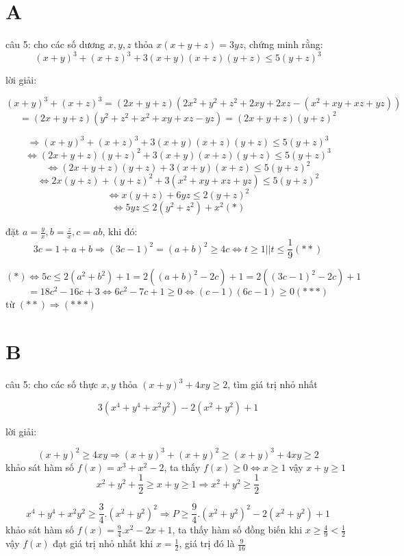 \documentclass{article}
\begin{document}
\section*{A}

câu 5: cho các số dương $x,y,z$ thỏa $x(x+y+z)=3yz$, chứng minh rằng:
\[(x+y)^3+(x+z)^3 +3(x+y)(x+z)(y+z)\leq 5(y+z)^3\]

lời giải:

\[(x+y)^3+(x+z)^3 = (2x+y+z)(2x^2+y^2+z^2 + 2xy+2xz - (x^2+xy+xz+yz))\]
\[=(2x+y+z)(y^2+z^2 +x^2+xy+xz - yz) = (2x+y+z)(y+z)^2\]

\[\Rightarrow (x+y)^3+(x+z)^3 +3(x+y)(x+z)(y+z)\leq 5(y+z)^3\]
\[\Leftrightarrow (2x+y+z)(y+z)^2 +3(x+y)(x+z)(y+z)\leq 5(y+z)^3\]
\[\Leftrightarrow (2x+y+z)(y+z) +3(x+y)(x+z)\leq 5(y+z)^2\]
\[\Leftrightarrow 2x(y+z) + (y+z)^2 + 3(x^2+xy+xz + yz)\leq 5(y+z)^2\]
\[\Leftrightarrow x(y+z) + 6yz\leq 2(y+z)^2\]
\[\Leftrightarrow 5yz\leq 2(y^2+z^2) + x^2 (*)\]

đặt $a=\frac{y}{x},b=\frac{z}{x},c=ab$, khi đó:
\[3c=1+a+b \Rightarrow (3c-1)^2=(a+b)^2\geq 4c \Leftrightarrow t\geq1 || t\leq \frac{1}{9} (**)\]

\[(*) \Leftrightarrow 5c \leq 2(a^2+b^2) + 1 = 2((a+b)^2-2c)+1 = 2((3c-1)^2-2c)+1\]
\[=18c^2-16c+3 \Leftrightarrow 6c^2-7c+1\geq0 \Leftrightarrow (c-1)(6c-1)\geq 0 (***)\]
từ $(**) \Rightarrow (***)$

\section*{B}

câu 5: cho các số thực $x,y$ thỏa $(x+y)^3+4xy \geq 2$, tìm giá trị nhỏ nhất

\[3(x^4+y^4+x^2y^2)-2(x^2+y^2)+1\]

lời giải: 

\[(x+y)^2\geq 4xy \Rightarrow (x+y)^3 + (x+y)^2 \geq (x+y)^3+4xy \geq 2\]
khảo sát hàm số $f(x)=x^3 + x^2 - 2$, ta thấy $f(x)\geq 0 \Leftrightarrow x\geq 1$
\newline
vậy $x+y \geq 1$
\[x^2+y^2+\frac{1}{2} \geq x+y \geq 1 \Rightarrow x^2+y^2 \geq \frac{1}{2}\]

\[x^4+y^4+x^2y^2 \geq \frac{3}{4}.(x^2+y^2)^2 \Rightarrow P \geq \frac{9}{4}.(x^2+y^2)^2-2(x^2+y^2)+1\]
khảo sát hàm số $f(x)=\frac{9}{4}.x^2-2x+1$, ta thấy hàm số đồng biến khi $x\geq \frac{4}{9} <\frac{1}{2}$
\newline
vậy $f(x)$ đạt giá trị nhỏ nhất khi $x=\frac{1}{2}$, giá trị đó là $\frac{9}{16}$
\end{document}
